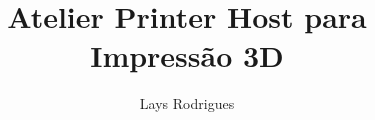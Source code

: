 \documentclass[a4paper,10pt]{article}
\title{Atelier Printer Host para Impressão 3D}
\author{Lays Rodrigues}
\begin{document}
\maketitle

\section{}
\end{document}
